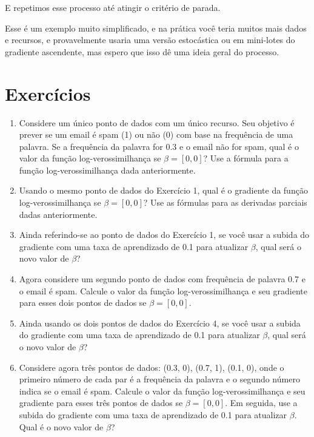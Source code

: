 \documentclass[12pt,a4paper, brazil]{article}
\begin{document}
E repetimos esse processo até atingir o critério de parada. 

Esse é um exemplo muito simplificado, e na prática você teria muitos mais dados e recursos, e provavelmente usaria uma versão estocástica ou em mini-lotes do gradiente ascendente, mas espero que isso dê uma ideia geral do processo.

\section{Exercícios}

\begin{enumerate}

\item Considere um único ponto de dados com um único recurso. Seu objetivo é prever se um email é spam (1) ou não (0) com base na frequência de uma palavra. Se a frequência da palavra for 0.3 e o email não for spam, qual é o valor da função log-verossimilhança se $\beta = [0, 0]$? Use a fórmula para a função log-verossimilhança dada anteriormente.

\item  Usando o mesmo ponto de dados do Exercício 1, qual é o gradiente da função log-verossimilhança se $\beta = [0, 0]$? Use as fórmulas para as derivadas parciais dadas anteriormente.

\item  Ainda referindo-se ao ponto de dados do Exercício 1, se você usar a subida do gradiente com uma taxa de aprendizado de 0.1 para atualizar $\beta$, qual será o novo valor de $\beta$?

\item Agora considere um segundo ponto de dados com frequência de palavra 0.7 e o email é spam. Calcule o valor da função log-verossimilhança e seu gradiente para esses dois pontos de dados se $\beta = [0, 0]$.

\item Ainda usando os dois pontos de dados do Exercício 4, se você usar a subida do gradiente com uma taxa de aprendizado de 0.1 para atualizar $\beta$, qual será o novo valor de $\beta$?

\item Considere agora três pontos de dados: (0.3, 0), (0.7, 1), (0.1, 0), onde o primeiro número de cada par é a frequência da palavra e o segundo número indica se o email é spam. Calcule o valor da função log-verossimilhança e seu gradiente para esses três pontos de dados se $\beta = [0, 0]$. Em seguida, use a subida do gradiente com uma taxa de aprendizado de 0.1 para atualizar $\beta$. Qual é o novo valor de $\beta$?

\end{enumerate}
\end{document}
